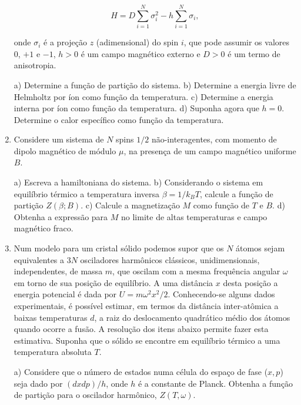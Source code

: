 \begin{enumerate}[start=1,label={\bfseries Q\arabic*.}]
$$
H = D \sum_{i=1}^{N} \sigma_{i}^{2} - h \sum_{i=1}^{N} \sigma_{i},
$$

onde $\sigma_{i}$ é a projeção $z$ (adimensional) do spin $i$, que pode assumir os valores 0, $+1$ e $-1$, $h > 0$ é um campo magnético externo e $D > 0$ é um termo de anisotropia.


a) Determine a função de partição do sistema.
b) Determine a energia livre de Helmholtz por íon como função da temperatura.
c) Determine a energia interna por íon como função da temperatura.
d) Suponha agora que $h = 0$. Determine o calor específico como função da temperatura.



\item Considere um sistema de $N$ spins $1/2$ não-interagentes, com momento de dipolo magnético de módulo $\mu$, na presença de um campo magnético uniforme $B$.


a) Escreva a hamiltoniana do sistema.
b) Considerando o sistema em equilíbrio térmico a temperatura inversa $\beta = 1/k_{B}T$, calcule a função de partição $Z(\beta;B)$.
c) Calcule a magnetização $M$ como função de $T$ e $B$.
d) Obtenha a expressão para $M$ no limite de altas temperaturas e campo magnético fraco.



\item Num modelo para um cristal sólido podemos supor que os $N$ átomos sejam equivalentes a $3N$ osciladores harmônicos clássicos, unidimensionais, independentes, de massa $m$, que oscilam com a mesma frequência angular $\omega$ em torno de sua posição de equilíbrio. A uma distância $x$ desta posição a energia potencial é dada por $U = m\omega^{2}x^{2}/2$. Conhecendo-se alguns dados experimentais, é possível estimar, em termos da distância inter-atômica a baixas temperaturas $d$, a raiz do deslocamento quadrático médio dos átomos quando ocorre a fusão. A resolução dos itens abaixo permite fazer esta estimativa. Suponha que o sólido se encontre em equilíbrio térmico a uma temperatura absoluta $T$.


a) Considere que o número de estados numa célula do espaço de fase ($x, p$) seja dado por $(dxdp)/h$, onde $h$ é a constante de Planck. Obtenha a função de partição para o oscilador harmônico, $Z(T,\omega)$.


\end{enumerate}
